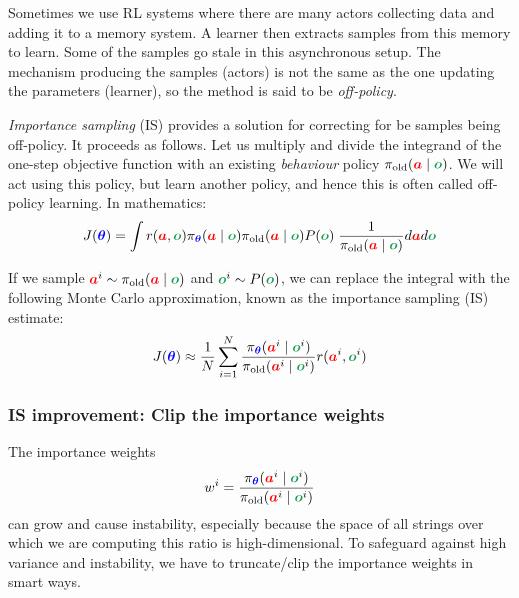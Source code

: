 \documentclass{article}
\newcommand{\colsym}[2]{\ensuremath{\textcolor{#1}{\boldsymbol{#2}}}}
\newcommand{\action}{\colsym{red}{a}}
\newcommand{\obs}{\colsym{ForestGreen}{o}}
\newcommand{\params}{\colsym{blue}{\theta}}
\begin{document}
Sometimes we use RL systems where there are many actors collecting data and adding it to a memory system. A learner then extracts samples from this memory to learn. Some of the samples go stale in this asynchronous setup. The mechanism producing the samples (actors) is not the same as the one updating the parameters (learner), so the method is said to be \emph{off-policy}.

\emph{Importance sampling} (IS) provides a solution for correcting for be samples being off-policy. It proceeds as follows. Let us multiply and divide the integrand of the one-step objective function with an existing \emph{behaviour} policy $\pi_{\text{old}}(\action \mid \obs)$. We will act using this policy, but learn another policy, and hence this is often called off-policy learning. In mathematics:
\[
J(\params) = \int r(\action, \obs) \pi_{\params}(\action \mid \obs) \pi_{\text{old}}(\action \mid \obs) P(\obs) \; \frac{1}{\pi_{\text{old}}(\action \mid \obs)} d\action d\obs
\]

If we sample $\action^i \sim \pi_{\text{old}}(\action \mid \obs)$ and $\obs^i \sim P(\obs)$, we can replace the integral with the following Monte Carlo approximation, known as the importance sampling (IS) estimate:
\[
J(\params) \approx \frac{1}{N} \sum_{i=1}^{N} \frac{\pi_{\params}(\action^i \mid \obs^i)}{\pi_{\text{old}}(\action^i \mid \obs^i)} r(\action^i, \obs^i)
\]

\subsubsection{IS improvement: Clip the importance weights}



The importance weights
\[
w^i =\frac{\pi_{\params}(\action^i \mid \obs^i)}{\pi_{\text{old}}(\action^i \mid \obs^i)}
\]
can grow and cause instability, especially because the space of all strings over which we are computing this ratio is high-dimensional.  
To safeguard against high variance and instability, we have to truncate/clip the importance weights in smart ways.
\end{document}
